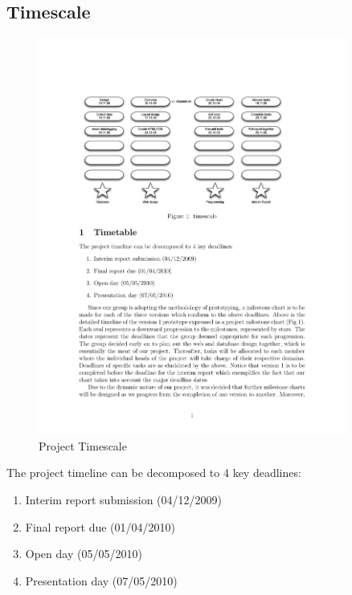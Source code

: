\subsection{Timescale}
\begin{figure}[h]
\includegraphics[width=0.9\textwidth]{timescale}
\caption{Project Timescale}
\label{fig:time_scale}
\end{figure}

The project timeline can be decomposed to 4 key deadlines:
\begin{enumerate}
	\item Interim report submission (04/12/2009)
	\item Final report due (01/04/2010)
	\item Open day (05/05/2010)
	\item Presentation day (07/05/2010)

\end{enumerate}



